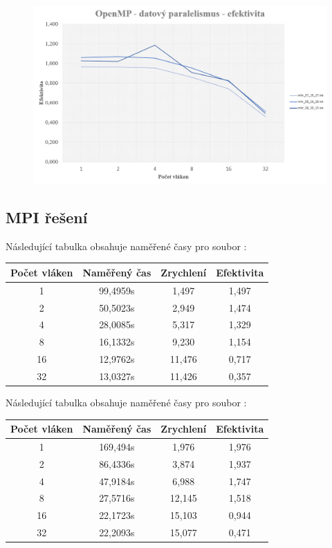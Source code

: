 \documentclass{article}
\begin{document}
\begin{figure}[H]
    \centering
    \includegraphics[width=\textwidth]{EfektivitaData.png}
\end{figure}

\subsection{MPI řešení}
Následující tabulka obsahuje naměřené časy pro soubor :
\begin{table}[H]\centering
    \begin{tabular}{|c|c|c|c|}
        \hline \textbf{Počet vláken} & \textbf{Naměřený čas} & \textbf{Zrychlení} & \textbf{Efektivita} \\ \hline \hline
        1 &	99,4959s & 1,497 & 1,497 \\ \hline
        2 &	50,5023s & 2,949 & 1,474 \\ \hline
        4 &	28,0085s & 5,317 & 1,329 \\ \hline
        8 &	16,1332s & 9,230 & 1,154 \\ \hline
        16 & 12,9762s & 11,476 & 0,717 \\ \hline
        32 &13,0327s & 11,426 & 0,357 \\ \hline
    \end{tabular}
\end{table} 
\noindent Následující tabulka obsahuje naměřené časy pro soubor :
\begin{table}[H]\centering
    \begin{tabular}{|c|c|c|c|}
        \hline \textbf{Počet vláken} & \textbf{Naměřený čas} & \textbf{Zrychlení} & \textbf{Efektivita} \\ \hline \hline
        1 &	169,494s & 1,976 & 1,976 \\ \hline 
        2 &	86,4336s & 3,874 & 1,937 \\ \hline
        4 &	47,9184s & 6,988 & 1,747 \\ \hline 
        8 &	27,5716s & 12,145 & 1,518 \\ \hline
        16 & 22,1723s & 15,103 & 0,944 \\ \hline
        32 & 22,2093s & 15,077 &0,471 \\ \hline
    \end{tabular}
\end{table} 
\end{document}
